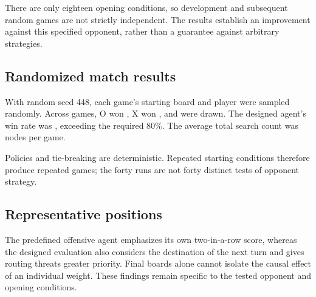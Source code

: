 \documentclass[UTF8,fontset=fandol,11pt,a4paper]{ctexart}
\begin{document}
\begin{table}[htbp]
  \centering\small
  \caption{Development comparison of mobility features.}\label{tab:tuning}
  
\end{table}

There are only eighteen opening conditions, so development and subsequent
random games are not strictly independent. The results establish an
improvement against this specified opponent, rather than a guarantee
against arbitrary strategies.

\subsection{Randomized match results}
With random seed 448, each game's starting board and player were sampled
randomly. Across \DesignedGames{} games, O won \DesignedWins{}, X won
\DesignedLosses{}, and \DesignedDraws{} were drawn. The designed agent's
win rate was \DesignedWinRate{}, exceeding the required 80\%.
The average total search count was \DesignedMeanNodes{} nodes per game.

\begin{table}[htbp]
  \centering\small
  \caption{Per-game results; node counts sum both players' searches.}\label{tab:random}
  \begin{minipage}[t]{.48\linewidth}\centering
    
  \end{minipage}\hfill
  \begin{minipage}[t]{.48\linewidth}\centering
    
  \end{minipage}
\end{table}

Policies and tie-breaking are deterministic. Repeated starting conditions
therefore produce repeated games; the forty runs are not forty distinct
tests of opponent strategy.

\clearpage
\subsection{Representative positions}




The predefined offensive agent emphasizes its own two-in-a-row score,
whereas the designed evaluation also considers the destination of the next
turn and gives routing threats greater priority. Final boards alone cannot
isolate the causal effect of an individual weight. These findings remain
specific to the tested opponent and opening conditions.
\end{document}
